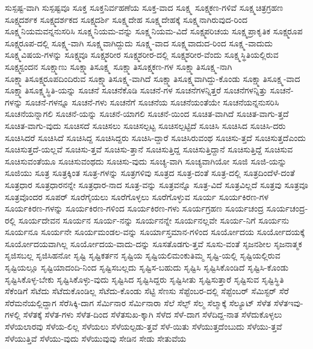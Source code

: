 {ಸುಸ್ಪಷ್ಟ-ವಾಗಿ
ಸುಸ್ಪಷ್ಟವೂ
ಸೂಕ್ತ
ಸೂಕ್ತನಿರ್ವಹಣೆಯ
ಸೂಕ್ತ-ವಾದ
ಸೂಕ್ಷ್ಮ
ಸೂಕ್ಷ್ಮಕಣ-ಗಳಿವೆ
ಸೂಕ್ಷ್ಮಚಿತ್ರಗ್ರಹಣ
ಸೂಕ್ಷ್ಮದರ್ಶಕ
ಸೂಕ್ಷ್ಮದರ್ಶಕದ
ಸೂಕ್ಷ್ಮದರ್ಶಿ
ಸೂಕ್ಷ್ಮದೇಹ
ಸೂಕ್ಷ್ಮದೇಹಕ್ಕೆ
ಸೂಕ್ಷ್ಮನಾಗಿರುವುದ-ರಿಂದ
ಸೂಕ್ಷ್ಮನಿಯಮವನ್ನನುಸರಿಸಿ
ಸೂಕ್ಷ್ಮನಿಯಮ-ವನ್ನು
ಸೂಕ್ಷ್ಮನಿಯಮ-ವಿದೆ
ಸೂಕ್ಷ್ಮಪರಿಚಯ
ಸೂಕ್ಷ್ಮಪ್ರಾಕೃತಿಕ
ಸೂಕ್ಷ್ಮರೂಪ
ಸೂಕ್ಷ್ಮರೂಪ-ದಲ್ಲಿ
ಸೂಕ್ಷ್ಮ-ವಾಗಿ
ಸೂಕ್ಷ್ಮವಾಗಿದ್ದುದು
ಸೂಕ್ಷ್ಮ-ವಾದ
ಸೂಕ್ಷ್ಮವಾದುದ-ರಿಂದ
ಸೂಕ್ಷ್ಮ-ವಾದುದು
ಸೂಕ್ಷ್ಮವಿಷಯ-ಗಳನ್ನು
ಸೂಕ್ಷ್ಮವೂ
ಸೂಕ್ಷ್ಮಶರೀರ
ಸೂಕ್ಷ್ಮಶರೀರ-ದಲ್ಲಿ
ಸೂಕ್ಷ್ಮಶರೀರ-ವೆಂದು
ಸೂಕ್ಷ್ಮಸ್ಥಿತಿಯಲ್ಲಿರುವ
ಸೂಕ್ಷ್ಮಸ್ಪಂದನ
ಸೂಕ್ಷ್ಮಾಣು
ಸೂಕ್ಷ್ಮಾತಿಸೂಕ್ಷ್ಮ
ಸೂಕ್ಷ್ಮಾತಿಸೂಕ್ಷ್ಮಕಣ-ಗಳ
ಸೂಕ್ಷ್ಮಾತಿಸೂಕ್ಷ್ಮ-ನಾಗಿ
ಸೂಕ್ಷ್ಮಾತಿಸೂಕ್ಷ್ಮರೂಪದಿಂದಿರುವ
ಸೂಕ್ಷ್ಮಾತಿಸೂಕ್ಷ್ಮ-ವಾಗಿದೆ
ಸೂಕ್ಷ್ಮಾತಿಸೂಕ್ಷ್ಮವಾಗಿದ್ದು-ಕೊಂಡು
ಸೂಕ್ಷ್ಮಾತಿಸೂಕ್ಷ್ಮ-ವಾದ
ಸೂಕ್ಷ್ಮಾತಿಸೂಕ್ಷ್ಮಸ್ಥಿತಿ-ಯನ್ನು
ಸೂಚನೆ
ಸೂಚನೆಕೊಡಿ
ಸೂಚನೆ-ಗಳ
ಸೂಚನೆಗಳನ್ನಿತ್ತರೆ
ಸೂಚನೆಗಳನ್ನಿತ್ತು
ಸೂಚನೆ-ಗಳನ್ನು
ಸೂಚನೆ-ಗಳನ್ನೂ
ಸೂಚನೆ-ಗಳು
ಸೂಚನೆಗೆ
ಸೂಚನೆಯ
ಸೂಚನೆಯಂತೆಯೇ
ಸೂಚನೆಯನ್ನನುಸರಿಸಿ
ಸೂಚನೆಯನ್ನಾಗಲಿ
ಸೂಚನೆ-ಯನ್ನು
ಸೂಚನೆ-ಯಾಗಲಿ
ಸೂಚನೆ-ಯಿಂದ
ಸೂಚಿತ-ವಾಗಿದೆ
ಸೂಚಿತ-ವಾಗು-ತ್ತದೆ
ಸೂಚಿತ-ವಾಗು-ವುದು
ಸೂಚಿಸದೆ
ಸೂಚಿಸಲು
ಸೂಚಿಸಲ್ಪಟ್ಟ
ಸೂಚಿಸಲ್ಪಟ್ಟಿದೆ
ಸೂಚಿಸಿ
ಸೂಚಿಸಿದ
ಸೂಚಿಸಿ-ದರು
ಸೂಚಿಸಿದರೆ
ಸೂಚಿಸಿದೆ
ಸೂಚಿಸಿದ್ದ
ಸೂಚಿಸಿದ್ದರು
ಸೂಚಿಸಿ-ದ್ದಾರೆ
ಸೂಚಿಸಿರುವಂಥ
ಸೂಚಿಸು-ತ್ತದೆ
ಸೂಚಿಸುತ್ತದೆಎಂದು
ಸೂಚಿಸುತ್ತದೆ-ಯಲ್ಲವೆ
ಸೂಚಿಸು-ತ್ತವೆ
ಸೂಚಿಸು-ತ್ತಾನೆ
ಸೂಚಿಸುತ್ತಿದ್ದ
ಸೂಚಿಸುತ್ತಿದ್ದಾನೆ
ಸೂಚಿಸುತ್ತಿದ್ದೆ
ಸೂಚಿಸುವ
ಸೂಚಿಸುವಂತೆಯೂ
ಸೂಚಿಸುವಂಥದು
ಸೂಚಿಸು-ವುದು
ಸೂಚ್ಯ-ವಾಗಿ
ಸೂಚ್ಯವಾಗಿಯೋ
ಸೂಜಿ
ಸೂಜಿ-ಯನ್ನು
ಸೂಜಿಯು
ಸೂತ್ರ
ಸೂತ್ರಕ್ಕಿಂತ
ಸೂತ್ರ-ಗಳನ್ನು
ಸೂತ್ರಗಳಿವು
ಸೂತ್ರದ
ಸೂತ್ರ-ದಂತೆ
ಸೂತ್ರ-ದಲ್ಲಿ
ಸೂತ್ರದಿಂದೆಳೆ-ದಂತೆ
ಸೂತ್ರಧಾರ
ಸೂತ್ರಧಾರನನ್ನೇ
ಸೂತ್ರಧಾರ-ನಾದ
ಸೂತ್ರ-ವನ್ನು
ಸೂತ್ರವನ್ನೊ
ಸೂತ್ರ-ವಿದೆ
ಸೂತ್ರವಿಲ್ಲದೆ
ಸೂತ್ರವು
ಸೂತ್ರವೂ
ಸೂತ್ರವೊಂದರ
ಸೂಪರ್
ಸೂರೆಗೈಯಲು
ಸೂರೆಗೊಳ್ಳಲು
ಸೂರೆಗೊಳ್ಳುವ
ಸೂರ್ಯ
ಸೂರ್ಯಕಿರಣ-ಗಳ
ಸೂರ್ಯಕಿರಣ-ಗಳನ್ನು
ಸೂರ್ಯಕಿರಣ-ಗಳಿಂದ
ಸೂರ್ಯಕಿರಣ-ಗಳು
ಸೂರ್ಯಗ್ರಹಣ
ಸೂರ್ಯಚಂದ್ರ
ಸೂರ್ಯಚಂದ್ರ-ರಲ್ಲಿ
ಸೂರ್ಯದೇವನ
ಸೂರ್ಯನ
ಸೂರ್ಯ-ನನ್ನು
ಸೂರ್ಯನನ್ನೇ
ಸೂರ್ಯನಲ್ಲವೇ
ಸೂರ್ಯ-ನಿಗೆ
ಸೂರ್ಯನು
ಸೂರ್ಯನೂ
ಸೂರ್ಯನೇ
ಸೂರ್ಯಮಂಡಲ-ವನ್ನು
ಸೂರ್ಯಾಸ್ತಮಾನ-ಗಳಿಂದ
ಸೂರ್ಯೋದಯ
ಸೂರ್ಯೋದಯಕ್ಕೆ
ಸೂರ್ಯೋದಯವಾಗಿಲ್ಲ
ಸೂರ್ಯೋದಯ-ವಾದು-ದನ್ನು
ಸೂಸತೊಡಗು-ತ್ತವೆ
ಸೂಸು-ವಂತೆ
ಸೃಜನಶೀಲ
ಸೃಜನಾತ್ಮಕ
ಸೃಜಿಸಬಲ್ಲ
ಸೃಜಿಸಿಹನೋ
ಸೃಷ್ಟಿ
ಸೃಷ್ಟಿಕರ್ತನ
ಸೃಷ್ಟಿಯ
ಸೃಷ್ಟಿಯಲಿಮಂಕುತಿಮ್ಮ
ಸೃಷ್ಟಿ-ಯಲ್ಲಿ
ಸೃಷ್ಟಿಯಲ್ಲಿರುವ
ಸೃಷ್ಟಿಯಲ್ಲೂ
ಸೃಷ್ಟಿಯಾದಂದಿ-ನಿಂದ
ಸೃಷ್ಟಿಸಬಲ್ಲದು
ಸೃಷ್ಟಿಸ-ಬಹುದು
ಸೃಷ್ಟಿಸಿ
ಸೃಷ್ಟಿಸಿಕೊಂಡಿದೆ
ಸೃಷ್ಟಿಸಿ-ಕೊಂಡು
ಸೃಷ್ಟಿಸಿಕೊಳ್ಳ-ಬೇಕು
ಸೃಷ್ಟಿಸಿಕೊಳ್ಳು-ವುದು
ಸೃಷ್ಟಿಸಿದ
ಸೃಷ್ಟಿಸಿದ್ದರು
ಸೃಷ್ಟಿಸೀತು
ಸೃಷ್ಟಿಸುತ್ತಾರೆ
ಸೃಷ್ಟಿಸುವ
ಸೃಷ್ಟಿಸ್ಥಿತಿ
ಸೆಕೆಂಡಿಗೆ
ಸೆಟೆದು
ಸೆಟೆದುಕೊಂಡಿಲ್ಲ
ಸೆಟೆದು-ಕೊಂಡು
ಸೆಟ್ಟಿ
ಸೆಣಸು
ಸೆಪ್ಟೆಂಬರ-ದಲ್ಲಿ
ಸೆಪ್ಟೆಂಬರ್
ಸೆಮಿಸ್ಟರ್
ಸೆರೆ
ಸೆರೆಮನೆಯಲ್ಲಿದ್ದಾಗ
ಸೆರೆಸಿಕ್ಕಿ-ದಾಗ
ಸೆರ್ಮಿನಾರ
ಸೆರ್ಮಿನಾರಾ
ಸೆಲೆ
ಸೆಲ್ಫ್
ಸೆಲ್ಮ
ಸೆಲ್ಮಾಕ್ಕೆ
ಸೆಲ್ಯೂಟ್
ಸೆಳೆತ
ಸೆಳೆತಇವು-ಗಳಲ್ಲಿ
ಸೆಳೆತಕ್ಕೆ
ಸೆಳೆತ-ಗಳು
ಸೆಳೆತ-ದಿಂದ
ಸೆಳೆತಸುಖ-ಕ್ಕಾಗಿ
ಸೆಳೆದ
ಸೆಳೆ-ದಾಗ
ಸೆಳೆದಿದ್ದ-ನಾತ
ಸೆಳೆದುಕೊಳ್ಳಲು
ಸೆಳೆಯಲಾರವು
ಸೆಳೆಯ-ಲಿಲ್ಲ
ಸೆಳೆಯಲು
ಸೆಳೆಯಲ್ಪಡು-ತ್ತವೆ
ಸೆಳೆ-ಯಿತು
ಸೆಳೆಯುತ್ತದೆಂಬುದು
ಸೆಳೆಯು-ತ್ತವೆ
ಸೆಳೆಯುತ್ತಿವೆ
ಸೆಳೆಯು-ವುದು
ಸೆಳೆಯುವುವು
ಸೇಡಿನ
ಸೇಡು
ಸೇತುವೆಯ
}
